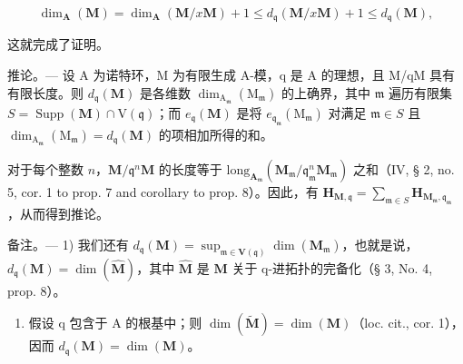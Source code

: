 \[
\dim_ {\mathbf {A}} (\mathbf {M}) = \dim_ {\mathbf {A}} (\mathbf {M} / x \mathbf {M}) + 1 \leqslant d _ {\mathfrak {q}} (\mathbf {M} / x \mathbf {M}) + 1 \leqslant d _ {\mathfrak {q}} (\mathbf {M}),
\]

这就完成了证明。

推论。--- 设 A 为诺特环，M 为有限生成 A-模，q 是 A 的理想，且 M/qM 具有有限长度。则 \(d_{\mathfrak{q}}(\mathbf{M})\) 是各维数 \(\dim_{\mathrm{A}_{\mathfrak{m}}}\left(\mathrm{M}_{\mathfrak{m}}\right)\) 的上确界，其中 \(\mathfrak{m}\) 遍历有限集 \(S = \operatorname{Supp}(\mathbf{M}) \cap \mathrm{V}(\mathfrak{q})\)；而 \(e_{\mathfrak{q}}(\mathbf{M})\) 是将 \(e_{\mathfrak{q}_{\mathfrak{m}}}\left(\mathrm{M}_{\mathfrak{m}}\right)\) 对满足 \(\mathfrak{m}\in S\) 且 \(\dim_{\mathrm{A}_{\mathfrak{m}}}\left(\mathrm{M}_{\mathfrak{m}}\right) = d_{\mathfrak{q}}(\mathbf{M})\) 的项相加所得的和。

对于每个整数 \(n\)，\(\mathbf{M} / \mathfrak{q}^n\mathbf{M}\) 的长度等于 \(\mathrm{long}_{\mathbf{A}_{\mathfrak{m}}}(\mathbf{M}_{\mathfrak{m}} / \mathfrak{q}_{\mathfrak{m}}^n\mathbf{M}_{\mathfrak{m}})\) 之和（IV, § 2, no. 5, cor. 1 to prop. 7 and corollary to prop. 8）。因此，有 \(\mathbf{H}_{\mathbf{M},\mathfrak{q}} = \sum_{\mathfrak{m}\in S}\mathbf{H}_{\mathbf{M}_{\mathfrak{m}},\mathfrak{q}_{\mathfrak{m}}}\)，从而得到推论。

备注。--- 1) 我们还有 \(d_{\mathfrak{q}}(\mathbf{M}) = \sup_{\mathfrak{m} \in \mathbf{V}(\mathfrak{q})} \dim(\mathbf{M}_{\mathfrak{m}})\)，也就是说，\(d_{\mathfrak{q}}(\mathbf{M}) = \dim(\hat{\mathbf{M}})\)，其中 \(\hat{\mathbf{M}}\) 是 \(\mathbf{M}\) 关于 q-进拓扑的完备化（§ 3, No. 4, prop. 8）。

\begin{enumerate}
\def\labelenumi{\arabic{enumi})}
\setcounter{enumi}{1}
\tightlist
\item
  假设 q 包含于 A 的根基中；则 \(\dim(\tilde{\mathbf{M}})=\dim(\mathbf{M})\)（loc. cit., cor. 1），因而 \(d_{\mathfrak{q}}(\mathbf{M})=\dim(\mathbf{M})\)。
\end{enumerate}

